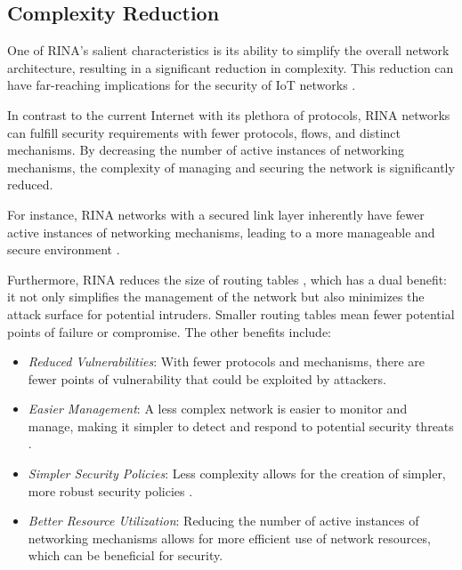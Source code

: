 \documentclass{ieeeaccess}
\begin{document}
\subsection{Complexity Reduction}
One of RINA's salient characteristics is its ability to simplify the overall network architecture, resulting in a significant reduction in complexity. This reduction can have far-reaching implications for the security of IoT networks \cite{small2012}.

In contrast to the current Internet with its plethora of protocols, RINA networks can fulfill security requirements with fewer protocols, flows, and distinct mechanisms. By decreasing the number of active instances of networking mechanisms, the complexity of managing and securing the network is significantly reduced.

For instance, RINA networks with a secured link layer inherently have fewer active instances of networking mechanisms, leading to a more manageable and secure environment \cite{small2012}.

Furthermore, RINA reduces the size of routing tables \cite{leon2016benefits, hrizi2017hierarchical, hrizi2015sfr}, which has a dual benefit: it not only simplifies the management of the network but also minimizes the attack surface for potential intruders. Smaller routing tables mean fewer potential points of failure or compromise. The other benefits include:

\begin{itemize}
	\item \textit{Reduced Vulnerabilities}: With fewer protocols and mechanisms, there are fewer points of vulnerability that could be exploited by attackers.
	\item \textit{Easier Management}: A less complex network is easier to monitor and manage, making it simpler to detect and respond to potential security threats \cite{en14102818}. 
	\item \textit{Simpler Security Policies}: Less complexity allows for the creation of simpler, more robust security policies \cite{s20051464}. 	
	\item \textit{Better Resource Utilization}: Reducing the number of active instances of networking mechanisms allows for more efficient use of network resources, which can be beneficial for security.
\end{itemize}
\end{document}
